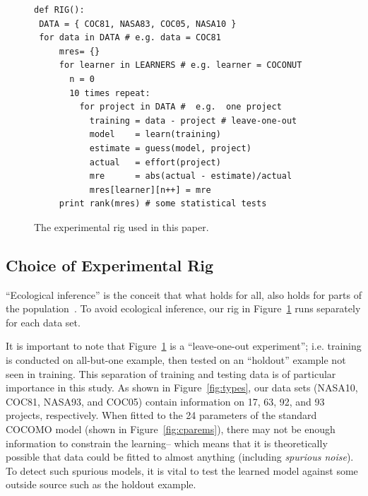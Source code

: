 \documentclass{sig-alternate}
\newcommand{\fig}[1]{Figure~\ref{fig:#1}}
\newenvironment{changed}{\par\color{MyDarkBlue}}{\par}
\begin{document}





\begin{figure}[!t]
\begin{lstlisting}
def RIG():
 DATA = { COC81, NASA83, COC05, NASA10 }
 for data in DATA # e.g. data = COC81
     mres= {}
     for learner in LEARNERS # e.g. learner = COCONUT
       n = 0
       10 times repeat: 
         for project in DATA #  e.g.  one project
           training = data - project # leave-one-out
           model    = learn(training)
           estimate = guess(model, project)
           actual   = effort(project)
           mre      = abs(actual - estimate)/actual
           mres[learner][n++] = mre
     print rank(mres) # some statistical tests
\end{lstlisting}
\caption{The experimental rig used in this paper.}\label{fig:rig}
\end{figure}



\subsection{Choice of Experimental Rig}


``Ecological inference''
is the conceit 
that what holds for all, also holds for parts 
of the population~\cite{posnet11,me12d}.
To avoid ecological inference,
our  rig in Figure~\ref{fig:rig}
runs separately for each data set.

\begin{changed}
It is important to note that Figure~\ref{fig:rig} is a ``leave-one-out experiment''; i.e.
training is conducted on all-but-one example, then tested
on an ``holdout'' example not seen in training. This separation of training and testing
data is of particular
importance in this study. 
As shown in \fig{types}, our  data sets (NASA10, COC81, NASA93, and COC05)
contain information on 17, 63, 92, and 93  projects, respectively. When fitted to
the   24 parameters of the standard COCOMO model  (shown in \fig{cparems}),
there may not be enough information to constrain the learning-- which means that it is theoretically
possible that data could be fitted to almost anything (including {\em spurious noise}).
To detect such spurious models, it is vital to test the learned model against some
outside source such as the holdout example.
\end{changed} 
\end{document}
